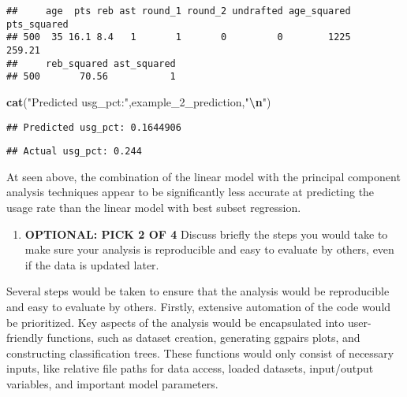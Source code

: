\documentclass[
]{article}
\newenvironment{Shaded}{\begin{snugshade}}{\end{snugshade}}
\newcommand{\FunctionTok}[1]{\textcolor[rgb]{0.13,0.29,0.53}{\textbf{#1}}}
\newcommand{\NormalTok}[1]{#1}
\newcommand{\SpecialCharTok}[1]{\textcolor[rgb]{0.81,0.36,0.00}{\textbf{#1}}}
\newcommand{\StringTok}[1]{\textcolor[rgb]{0.31,0.60,0.02}{#1}}
\providecommand{\tightlist}{%
  \setlength{\itemsep}{0pt}\setlength{\parskip}{0pt}}
\begin{document}
\begin{verbatim}
##     age  pts reb ast round_1 round_2 undrafted age_squared pts_squared
## 500  35 16.1 8.4   1       1       0         0        1225      259.21
##     reb_squared ast_squared
## 500       70.56           1
\end{verbatim}

\begin{Shaded}
\begin{Highlighting}[]
\FunctionTok{cat}\NormalTok{(}\StringTok{"Predicted usg\_pct:"}\NormalTok{,example\_2\_prediction,}\StringTok{"}\SpecialCharTok{\textbackslash{}n}\StringTok{"}\NormalTok{)}
\end{Highlighting}
\end{Shaded}

\begin{verbatim}
## Predicted usg_pct: 0.1644906
\end{verbatim}

\begin{Shaded}
\end{Shaded}

\begin{verbatim}
## Actual usg_pct: 0.244
\end{verbatim}

At seen above, the combination of the linear model with the principal
component analysis techniques appear to be significantly less accurate
at predicting the usage rate than the linear model with best subset
regression.

\vspace{2cm}
\newpage

\begin{enumerate}
\def\labelenumi{\arabic{enumi})}
\setcounter{enumi}{6}
\tightlist
\item
  \textbf{OPTIONAL: PICK 2 OF 4} Discuss briefly the steps you would
  take to make sure your analysis is reproducible and easy to evaluate
  by others, even if the data is updated later.
\end{enumerate}

Several steps would be taken to ensure that the analysis would be
reproducible and easy to evaluate by others. Firstly, extensive
automation of the code would be prioritized. Key aspects of the analysis
would be encapsulated into user-friendly functions, such as dataset
creation, generating ggpairs plots, and constructing classification
trees. These functions would only consist of necessary inputs, like
relative file paths for data access, loaded datasets, input/output
variables, and important model parameters.
\end{document}
